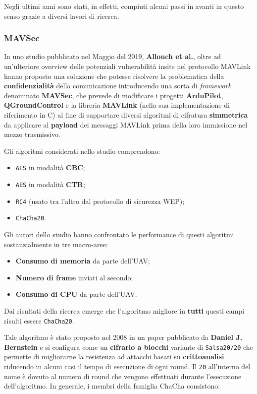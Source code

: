 \documentclass[a4paper, 12pt, oneside]{article}
\theoremstyle{definition}
\begin{document}
Negli ultimi anni sono stati, in effetti, compiuti alcuni passi in avanti in questo senso grazie a diversi lavori di ricerca.

\subsubsection{MAVSec}
In uno studio \cite{DBLP:journals/corr/abs-1905-00265} pubblicato nel Maggio del 2019, \textbf{Allouch et al.}, oltre ad un'ulteriore overview delle potenziali vulnerabilità insite nel protocollo MAVLink hanno proposto una soluzione che potesse risolvere la problematica della \textbf{confidenzialità} della comunicazione introducendo una sorta di \textit{framework} denominato \textbf{MAVSec}, che prevede di modificare i progetti \textbf{ArduPilot}, \textbf{QGroundControl} e la libreria \textbf{MAVLink} (nella sua implementazione di riferimento in C) al fine di supportare diversi algoritmi di cifratura \textbf{simmetrica} da applicare al \textbf{payload} dei messaggi MAVLink prima della loro immissione nel mezzo trasmissivo.

Gli algoritmi considerati nello studio comprendono:

\begin{itemize}
    \item \texttt{AES} in modalità \textbf{CBC};
    \item \texttt{AES} in modalità \textbf{CTR};
    \item \texttt{RC4} (usato tra l'altro dal protocollo di sicurezza WEP);
    \item \texttt{ChaCha20}.
\end{itemize}

Gli autori dello studio hanno confrontato le performance di questi algoritmi sostanzialmente in tre macro-aree:

\begin{itemize}
    \item \textbf{Consumo di memoria} da parte dell'UAV;
    \item \textbf{Numero di frame} inviati al secondo;
    \item \textbf{Consumo di CPU} da parte dell'UAV.
\end{itemize}

Dai risultati della ricerca emerge che l'algoritmo migliore in \textbf{tutti} questi campi risulti essere \texttt{ChaCha20}.

Tale algoritmo è stato proposto nel 2008 in un paper \cite{chacha20} pubblicato da \textbf{Daniel J. Bernstein} e si configura come un \textbf{cifrario a blocchi} variante di \texttt{Salsa20/20} che permette di migliorarne la resistenza ad attacchi basati su \textbf{crittoanalisi} riducendo in alcuni casi il tempo di esecuzione di ogni round. Il \texttt{20} all'interno del nome è dovuto al numero di round che vengono effettuati durante l'esecuzione dell'algoritmo. In generale, i membri della famiglia ChaCha consistono:
\end{document}

